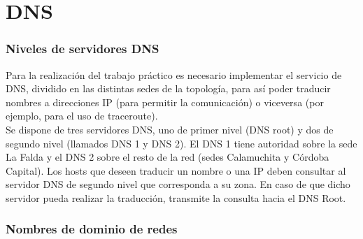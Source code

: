 \section{DNS}

\subsubsection{Niveles de servidores DNS}

Para la realización del trabajo práctico es necesario implementar el servicio de DNS, dividido en las distintas sedes de la topología, para así poder traducir nombres a direcciones IP (para permitir la comunicación) o viceversa (por ejemplo, para el uso de traceroute). \\ 

Se dispone de tres servidores DNS, uno de primer nivel (DNS root) y dos de segundo nivel (llamados DNS 1 y DNS 2). El DNS 1 tiene autoridad sobre la sede La Falda y el DNS 2 sobre el resto de la red (sedes Calamuchita y Córdoba Capital). Los hosts que deseen traducir un nombre o una IP deben consultar al servidor DNS de segundo nivel que corresponda a su zona. En caso de que dicho servidor pueda realizar la traducción, transmite la consulta hacia el DNS Root. \\

\subsubsection{Nombres de dominio de redes}



